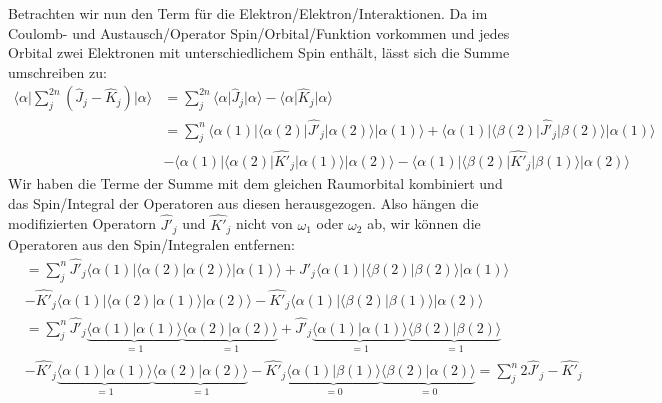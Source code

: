Betrachten wir nun den Term für die Elektron\-/Elektron\-/Interaktionen.
Da im Coulomb- und Austausch\-/Operator Spin\-/Orbital\-/Funktion vorkommen und
jedes Orbital zwei Elektronen mit unterschiedlichem Spin enthält, lässt sich die Summe umschreiben zu:
\begin{align*}
  \langle \alpha \vert \sum_j^{2n} \left( \hat{J}_j - \hat{K}_j \right) \vert \alpha \rangle
  &= \sum_j^{2n} \langle \alpha \vert \hat{J}_j \vert \alpha \rangle
  - \langle \alpha \vert \hat{K}_j \vert \alpha \rangle \\
  &= \sum_j^{n} 
  \langle \alpha(1) \vert \langle \alpha(2) \vert \hat{J'}_j \vert \alpha(2) \rangle \vert \alpha(1) \rangle
  + \langle \alpha(1) \vert \langle \beta(2) \vert \hat{J'}_j \vert \beta(2) \rangle \vert \alpha(1) \rangle\\
  &- \langle \alpha(1) \vert \langle \alpha(2) \vert \hat{K'}_j \vert \alpha(1) \rangle \vert \alpha(2) \rangle
  - \langle \alpha(1) \vert \langle \beta(2) \vert \hat{K'}_j \vert \beta(1) \rangle \vert \alpha(2) \rangle
\end{align*}
Wir haben die Terme der Summe mit dem gleichen Raumorbital kombiniert und
das Spin\-/Integral der Operatoren aus diesen herausgezogen.
Also hängen die modifizierten Operatorn $\hat{J'}_j$ und $\hat{K'}_j$ nicht von $\omega_1$ oder $\omega_2$ ab,
wir können die Operatoren aus den Spin\-/Integralen entfernen:
\begin{align*}
  &=\sum_j^{n} 
  \hat{J'}_j \langle \alpha(1) \vert \langle \alpha(2) \vert \alpha(2) \rangle \vert \alpha(1) \rangle
  + \hat{J'}_j \langle \alpha(1) \vert \langle \beta(2) \vert \beta(2) \rangle \vert \alpha(1) \rangle\\
  &- \hat{K'}_j \langle \alpha(1) \vert \langle \alpha(2) \vert \alpha(1) \rangle \vert \alpha(2) \rangle
  - \hat{K'}_j \langle \alpha(1) \vert \langle \beta(2) \vert \beta(1) \rangle \vert \alpha(2) \rangle\\
  &=\sum_j^{n} 
  \hat{J'}_j \underbrace{\langle \alpha(1) \vert \alpha(1) \rangle}_{=1}
  \underbrace{\langle \alpha(2) \vert \alpha(2) \rangle}_{=1}
  + \hat{J'}_j \underbrace{\langle \alpha(1) \vert \alpha(1) \rangle}_{=1}
  \underbrace{\langle \beta(2) \vert \beta(2) \rangle}_{=1}\\
  &- \hat{K'}_j \underbrace{\langle \alpha(1) \vert \alpha(1) \rangle}_{=1}
  \underbrace{\langle \alpha(2) \vert \alpha(2) \rangle}_{=1}
  - \hat{K'}_j \underbrace{\langle \alpha(1) \vert \beta(1) \rangle}_{=0}
  \underbrace{\langle \beta(2) \vert \alpha(2) \rangle}_{=0}
  =\sum_j^{n} 2\hat{J'}_j - \hat{K'}_j
\end{align*}

